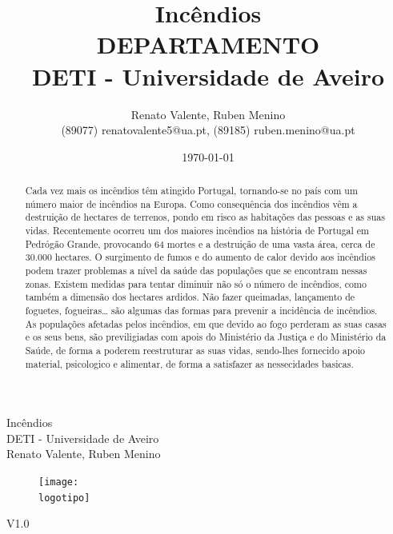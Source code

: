 \documentclass{report}
\begin{document}
\def\titulo{Incêndios}
\def\data{\today}
\def\autores{Renato Valente, Ruben Menino}
\def\autorescontactos{(89077) renatovalente5@ua.pt, (89185) ruben.menino@ua.pt}
\def\versao{V1.0}
\def\departamento{DEPARTAMENTO}
\def\empresa{DETI - Universidade de Aveiro}
\def\logotipo{ua.pdf}
%
%
\begin{titlepage}

\begin{center}
%
\vspace*{50mm}
%
{\Huge \titulo}\\ 
%
\vspace{10mm}
%
{\Large \empresa}\\
%
\vspace{10mm}
%
{\LARGE \autores}\\ 
%
\vspace{30mm}
%
\begin{figure}[h]
\center
\texttt{[image: \\logotipo]}
\end{figure}
%
\vspace{30mm}
\end{center}
%
\begin{flushright}
\versao
\end{flushright}
\end{titlepage}

\title{%
{\Huge\textbf{\titulo}}\\
{\Large \departamento\\ \empresa}
}
%
\author{%
    \autores \\
    \autorescontactos
}
%
\date{\data}
%
\maketitle


\begin{abstract}
Cada vez mais os incêndios têm atingido Portugal, tornando-se no país com um número maior de incêndios na Europa. Como consequência dos incêndios vêm a destruição de hectares de terrenos, pondo em risco as habitações das pessoas e as suas vidas. Recentemente ocorreu um dos maiores incêndios na história de Portugal em Pedrógão Grande, provocando 64 mortes e a destruição de uma vasta área, cerca de 30.000 hectares. O surgimento de fumos e do aumento de calor devido aos incêndios podem trazer problemas a nível da saúde das populações que se encontram nessas zonas. Existem medidas para tentar diminuir não só o número de incêndios, como também a dimensão dos hectares ardidos. Não fazer queimadas, lançamento de foguetes, fogueiras… são algumas das formas para prevenir a incidência de incêndios. As populações afetadas pelos incêndios, em que devido ao fogo perderam as suas casas e os seus bens, são previligiadas com apois do Ministério da Justiça e do Ministério da Saúde, de forma a poderem reestruturar as suas vidas, sendo-lhes fornecido apoio material, psicologico e alimentar, de forma a satisfazer as nessecidades basicas. 
\end{abstract}
\end{document}
